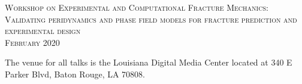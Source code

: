 \documentclass[10pt,letterpaper]{article} %
\begin{document}
\pagestyle{empty} %

\setlength{\parindent}{0pt} %



\begin{center}
	\textsc{\LARGE Workshop on Experimental and Computational Fracture Mechanics: \\
	\small Validating peridynamics and phase field models for fracture prediction and 	experimental design}\\ %
	\textsc{\large February 2020} %
\end{center}




\begin{center}
The venue for all talks is the Louisiana Digital Media Center located at 340 E Parker Blvd, Baton Rouge, LA 70808.
\end{center}
\end{document}

